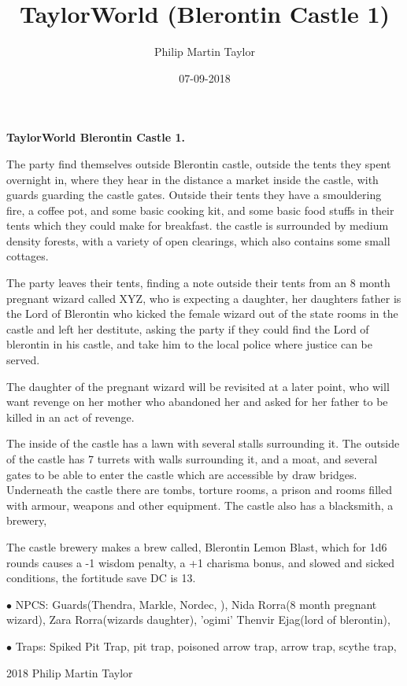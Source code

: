 \documentclass[12pt,a4paper]{book}
\date{07-09-2018}
\author{Philip Martin Taylor}
\title{TaylorWorld (Blerontin Castle 1)}
\begin{document}
\begin{center}
\textbf{TaylorWorld\texttrademark \: Blerontin Castle 1.}
\end{center}
\begin{flushleft}
  The party find themselves outside Blerontin castle, outside the tents they spent overnight in, where they hear in the distance a market inside the castle, with guards guarding the castle gates. Outside their tents they have a smouldering fire, a coffee pot, and some basic cooking kit, and some basic food stuffs in their tents which they could make for breakfast. the castle is surrounded by medium density forests, with a variety of open clearings, which also contains some small cottages.
\end{flushleft}
\begin{flushleft}
  The party leaves their tents, finding a note outside their tents from an 8 month pregnant wizard called XYZ, who is expecting a daughter, her daughters father is the Lord of Blerontin who kicked the female wizard out of the state rooms in the castle and left her destitute, asking the party if they could find the Lord of blerontin in his castle, and take him to the local police where justice can be served.
\end{flushleft}
\begin{flushleft}
  The daughter of the pregnant wizard will be revisited at a later point, who will want revenge on her mother who abandoned her and asked for her father to be killed in an act of revenge.
\end{flushleft}
\begin{flushleft}
  The inside of the castle has a lawn with several stalls surrounding it. The outside of the castle has 7 turrets with walls surrounding it, and a moat, and several gates to be able to enter the castle which are accessible by draw bridges. Underneath the castle there are tombs, torture rooms, a prison and rooms filled with armour, weapons and other equipment. The castle also has a blacksmith, a brewery, 
\end{flushleft}
\begin{flushleft}
  The castle brewery makes a brew called, Blerontin Lemon Blast, which for 1d6 rounds causes a -1 wisdom penalty, a +1 charisma bonus, and slowed and sicked conditions, the fortitude save DC is 13.
\end{flushleft}
\begin{flushleft}
\item[$\bullet$ NPCS:] Guards(Thendra, Markle, Nordec,  ), Nida Rorra(8 month pregnant wizard), Zara Rorra(wizards daughter), 'ogimi' Thenvir Ejag(lord of blerontin),
  \item[$\bullet$ Traps:] Spiked Pit Trap, pit trap, poisoned arrow trap, arrow trap, scythe trap, 
\end{flushleft}
\begin{center}
  \textcopyright{} 2018 Philip Martin Taylor
\end{center}
\end{document}
